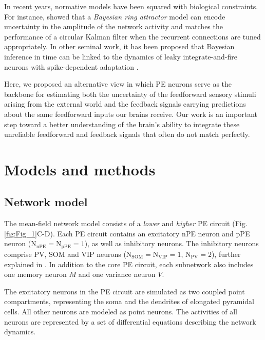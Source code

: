 \documentclass[10pt,a4paper]{article}
\begin{document}
In recent years, normative models have been squared with biological constraints. For instance, \cite{kutschireiter2023bayesian} showed that a \textit{Bayesian ring attractor} model can encode uncertainty in the amplitude of the network activity and matches the performance of a circular Kalman filter when the recurrent connections are tuned appropriately. In other seminal work, it has been proposed that Bayesian inference in time can be linked to the dynamics of leaky integrate-and-fire neurons with spike-dependent adaptation \citep{deneve2008bayesian}.

Here, we proposed an alternative view in which PE neurons serve as the backbone for estimating both the uncertainty of the feedforward sensory stimuli arising from the external world and the feedback signals carrying predictions about the same feedforward inputs our brains receive. Our work is an important step toward a better understanding of the brain’s ability to integrate these unreliable feedforward and feedback signals that often do not match perfectly. 


\section*{Models and methods}
%
\subsection*{Network model}
The mean-field network model consists of a \textit{lower} and \textit{higher} PE circuit (Fig. \ref{fig:Fig_1}C-D). Each PE circuit contains an excitatory nPE neuron and pPE neuron ($\mathrm{N}_\mathrm{nPE} = \mathrm{N}_\mathrm{pPE} = 1$), as well as inhibitory neurons. The inhibitory neurons comprise PV, SOM and VIP neurons ($\mathrm{N}_\mathrm{SOM} = \mathrm{N}_\mathrm{VIP} = 1$, $\mathrm{N}_\mathrm{PV} = 2$), further explained in \cite{hertag2022prediction}. In addition to the core PE circuit, each subnetwork also includes one memory neuron $M$ and one variance neuron $V$. 

The excitatory neurons in the PE circuit are simulated as two coupled point compartments, representing the soma and the dendrites of elongated pyramidal cells. All other neurons are modeled as point neurons. The activities of all neurons are represented by a set of differential equations describing the network dynamics. 
\end{document}
